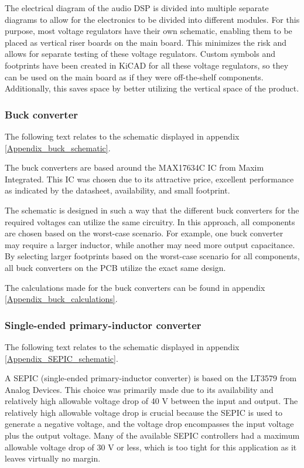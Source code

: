 The electrical diagram of the audio DSP is divided into multiple separate diagrams to allow for the electronics to be divided into different modules. For this purpose, most voltage regulators have their own schematic, enabling them to be placed as vertical riser boards on the main board. This minimizes the risk and allows for separate testing of these voltage regulators. Custom symbols and footprints have been created in KiCAD for all these voltage regulators, so they can be used on the main board as if they were off-the-shelf components. Additionally, this saves space by better utilizing the vertical space of the product.

\subsubsection{Buck converter}
The following text relates to the schematic displayed in appendix \ref{Appendix_buck_schematic}.

The buck converters are based around the MAX17634C IC from Maxim Integrated. This IC was chosen due to its attractive price, excellent performance as indicated by the datasheet, availability, and small footprint.

The schematic is designed in such a way that the different buck converters for the required voltages can utilize the same circuitry. In this approach, all components are chosen based on the worst-case scenario. For example, one buck converter may require a larger inductor, while another may need more output capacitance. By selecting larger footprints based on the worst-case scenario for all components, all buck converters on the PCB utilize the exact same design.

The calculations made for the buck converters can be found in appendix \ref{Appendix_buck_calculations}.

\subsubsection{Single-ended primary-inductor converter}
The following text relates to the schematic displayed in appendix \ref{Appendix_SEPIC_schematic}.

A SEPIC (single-ended primary-inductor converter) is based on the LT3579 from Analog Devices. This choice was primarily made due to its availability and relatively high allowable voltage drop of 40 V between the input and output. The relatively high allowable voltage drop is crucial because the SEPIC is used to generate a negative voltage, and the voltage drop encompasses the input voltage plus the output voltage. Many of the available SEPIC controllers had a maximum allowable voltage drop of 30 V or less, which is too tight for this application as it leaves virtually no margin.

